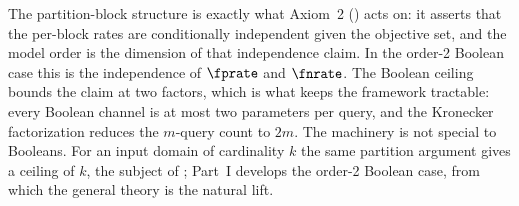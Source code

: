 The partition-block structure is exactly what Axiom~2
() acts on: it asserts that the per-block rates are
conditionally independent given the objective set, and the model order is the
dimension of that independence claim. In the order-2 Boolean case this is the
independence of $\fprate$ and $\fnrate$. The Boolean ceiling bounds the claim at
two factors, which is what keeps the framework tractable: every Boolean channel
is at most two parameters per query, and the Kronecker factorization reduces the
$m$-query count to $2m$. The machinery is not special to Booleans. For an input
domain of cardinality $k$ the same partition argument gives a ceiling of $k$,
the subject of ; Part~I develops the order-2
Boolean case, from which the general theory is the natural lift.
